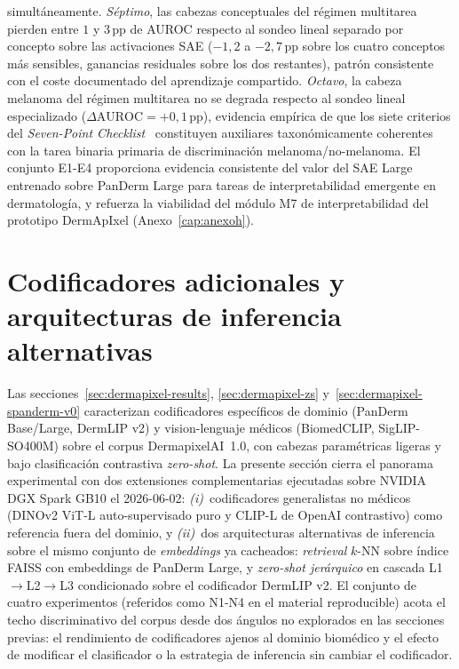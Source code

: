 simultáneamente. \textit{Séptimo}, las cabezas conceptuales del
régimen multitarea pierden entre $1$ y $3$\,pp de AUROC respecto
al sondeo lineal separado por concepto sobre las activaciones SAE
($-1{,}2$ a $-2{,}7$\,pp sobre los cuatro conceptos más
sensibles, ganancias residuales sobre los dos restantes), patrón
consistente con el coste documentado del aprendizaje
compartido. \textit{Octavo}, la cabeza melanoma del régimen
multitarea no se degrada respecto al sondeo lineal especializado
($\Delta \mathrm{AUROC} = +0{,}1$\,pp), evidencia empírica de que
los siete criterios del \emph{Seven-Point
Checklist}~\cite{kawahara2019} constituyen auxiliares
taxonómicamente coherentes con la tarea binaria primaria de
discriminación melanoma/no-melanoma. El conjunto E1-E4 proporciona
evidencia consistente del valor del SAE Large entrenado sobre
PanDerm Large para tareas de interpretabilidad emergente en
dermatología, y refuerza la viabilidad del módulo M7 de
interpretabilidad del prototipo DermApIxel
(Anexo~\ref{cap:anexoh}).

\section{Codificadores adicionales y arquitecturas de inferencia
alternativas}
\label{sec:dermapixel-extra}

Las secciones~\ref{sec:dermapixel-results}, \ref{sec:dermapixel-zs}
y~\ref{sec:dermapixel-spanderm-v0} caracterizan codificadores
específicos de dominio (PanDerm Base/Large, DermLIP v2) y
vision-lenguaje médicos (BiomedCLIP, SigLIP-SO400M) sobre el
corpus DermapixelAI~1.0, con cabezas paramétricas ligeras y bajo
clasificación contrastiva \emph{zero-shot}. La presente sección
cierra el panorama experimental con dos extensiones complementarias
ejecutadas sobre NVIDIA DGX Spark GB10 el 2026-06-02:
\emph{(i)}~codificadores generalistas no médicos (DINOv2 ViT-L
auto-supervisado puro y CLIP-L de OpenAI contrastivo) como
referencia fuera del dominio, y \emph{(ii)}~dos arquitecturas
alternativas de inferencia sobre el mismo conjunto de
\emph{embeddings} ya cacheados: \emph{retrieval} $k$-NN sobre
índice FAISS con embeddings de PanDerm Large, y \emph{zero-shot
jerárquico} en cascada L1$\to$L2$\to$L3 condicionado sobre el
codificador DermLIP v2. El conjunto de cuatro experimentos
(referidos como N1-N4 en el material reproducible) acota el techo
discriminativo del corpus desde dos ángulos no explorados en las
secciones previas: el rendimiento de codificadores ajenos al
dominio biomédico y el efecto de modificar el clasificador o la
estrategia de inferencia sin cambiar el codificador.

